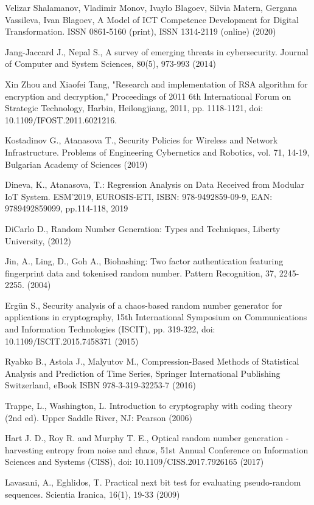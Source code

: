 \documentclass[runningheads]{llncs}
\begin{document}
\begin{thebibliography}{8}
 Velizar Shalamanov, Vladimir Monov, Ivaylo Blagoev, Silvia Matern, Gergana Vassileva, Ivan Blagoev, A Model of ICT Competence Development for Digital Transformation. ISSN 0861-5160 (print), ISSN 1314-2119 (online) (2020)

 Jang-Jaccard J., Nepal S., A survey of emerging threats in cybersecurity. Journal of Computer and System Sciences, 80(5), 973-993 (2014)

 Xin Zhou and Xiaofei Tang, "Research and implementation of RSA algorithm for encryption and decryption," Proceedings of 2011 6th International Forum on Strategic Technology, Harbin, Heilongjiang, 2011, pp. 1118-1121, doi: 10.1109/IFOST.2011.6021216.

 Kostadinov G., Atanasova T., Security Policies for Wireless and Network Infrastructure. Problems of Engineering Cybernetics and Robotics, vol. 71, 14-19, Bulgarian Academy of Sciences (2019)

 Dineva, K., Atanasova, T.: Regression Analysis on Data Received from Modular IoT System. ESM’2019, EUROSIS-ETI, ISBN: 978-9492859-09-9, EAN: 9789492859099, pp.114-118, 2019

 DiCarlo D., Random Number Generation: Types and Techniques, Liberty University, (2012)

 Jin, A., Ling, D., Goh A., Biohashing: Two factor authentication featuring fingerprint data and tokenised random number. Pattern Recognition, 37, 2245- 2255. (2004)

 Ergün S., Security analysis of a chaos-based random number generator for applications in cryptography, 15th International Symposium on Communications and Information Technologies (ISCIT), pp. 319-322, doi: 10.1109/ISCIT.2015.7458371 (2015)

 Ryabko B., Astola J., Malyutov M., Compression-Based Methods of Statistical Analysis and Prediction of Time Series, Springer International Publishing Switzerland, eBook ISBN 978-3-319-32253-7 (2016)

 Trappe, L., Washington, L. Introduction to cryptography with coding theory (2nd ed). Upper Saddle River, NJ: Pearson (2006)

 Hart J. D., Roy R. and Murphy T. E., Optical random number generation - harvesting entropy from noise and chaos, 51st Annual Conference on Information Sciences and Systems (CISS), doi: 10.1109/CISS.2017.7926165 (2017)

 Lavasani, A., Eghlidos, T. Practical next bit test for evaluating pseudo-random sequences. Scientia Iranica, 16(1), 19-33 (2009)


\end{thebibliography}
\end{document}
